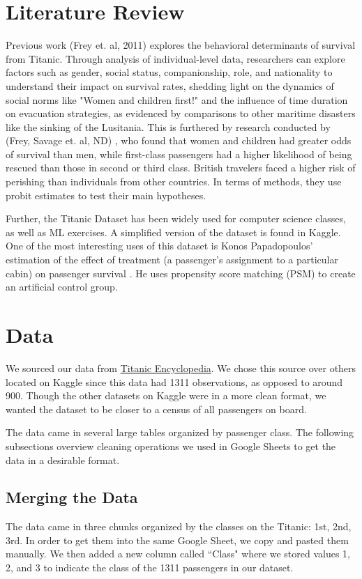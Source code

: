 \documentclass[12pt]{article}
\begin{document}
\section{Literature Review}
\doublespacing
Previous work (Frey et. al, 2011) \cite{frey2011behavior} explores the behavioral determinants of survival from Titanic. Through analysis of individual-level data, researchers can explore factors such as gender, social status, companionship, role, and nationality to understand their impact on survival rates, shedding light on the dynamics of social norms like "Women and children first!" and the influence of time duration on evacuation strategies, as evidenced by comparisons to other maritime disasters like the sinking of the Lusitania. This is furthered by research conducted by (Frey, Savage et. al, ND) \cite{frey2011behavior}, who found that women and children had greater odds of survival than men, while first-class passengers had a higher likelihood of being rescued than those in second or third class. British travelers faced a higher risk of perishing than individuals from other countries. In terms of methods, they use probit estimates to test their main hypotheses.

Further, the Titanic Dataset has been widely used for computer science classes, as well as ML exercises. A simplified version of the dataset is found in Kaggle. One of the most interesting uses of this dataset is Konos Papadopoulos’ estimation of the effect of treatment (a passenger’s assignment to a particular cabin) on passenger survival \cite{githubPropensityScoreMatching}. He uses propensity score matching (PSM) to create an artificial control group.

\section{Data}
\doublespacing
We sourced our data from \href{https://www.encyclopedia-titanica.org/}{Titanic Encyclopedia}. We chose this source over others located on Kaggle since this data had 1311 observations, as opposed to around 900. Though the other datasets on Kaggle were in a more clean format, we wanted the dataset to be closer to a census of all passengers on board.

The data came in several large tables organized by passenger class. The following subsections overview cleaning operations we used in Google Sheets to get the data in a desirable format.

\subsection{Merging the Data}
\doublespacing
The data came in three chunks organized by the classes on the Titanic: 1st, 2nd, 3rd. In order to get them into the same Google Sheet, we copy and pasted them manually. We then added a new column called ``Class" where we stored values 1, 2, and 3 to indicate the class of the 1311 passengers in our dataset.
\end{document}
